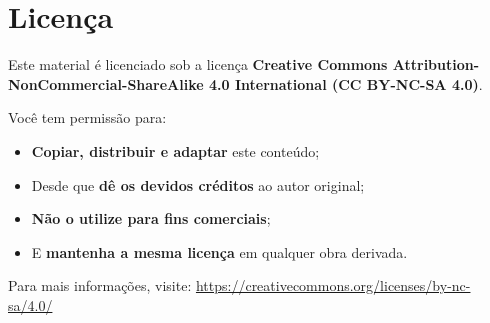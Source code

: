\documentclass[12pt]{book}
\begin{document}
	
	
	\newpage
	\section*{Licença \faCreativeCommons}
	
	Este material é licenciado sob a licença \textbf{Creative Commons Attribution-NonCommercial-ShareAlike 4.0 International (CC BY-NC-SA 4.0)}.
	
	\vspace{1em}
	
	Você tem permissão para:
	
	\begin{itemize}
		\item \textbf{Copiar, distribuir e adaptar} este conteúdo;
		\item Desde que \textbf{dê os devidos créditos} ao autor original;
		\item \textbf{Não o utilize para fins comerciais};
		\item E \textbf{mantenha a mesma licença} em qualquer obra derivada.
	\end{itemize}
	
	\vspace{1em}
	
	Para mais informações, visite:  
	\href{https://creativecommons.org/licenses/by-nc-sa/4.0/}{https://creativecommons.org/licenses/by-nc-sa/4.0/}
	
	\vfill
	
	\begin{center}
		\faCreativeCommons\quad
		\faCreativeCommonsBy\quad
		\faCreativeCommonsNc\quad
		\faCreativeCommonsSa
	\end{center}
	
\end{document}
